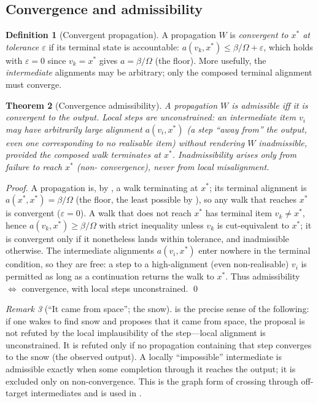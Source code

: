 \documentclass[11pt,a4paper]{article}
\theoremstyle{thmstyle}
\newtheorem{theorem}{Theorem}[section]
\theoremstyle{definition}
\newtheorem{definition}[theorem]{Definition}
\theoremstyle{remark}
\newtheorem{remark}[theorem]{Remark}
\newcommand{\flo}{\beta}                 %
\newcommand{\eps}{\varepsilon}
\begin{document}
\subsection{Convergence and admissibility}

\begin{definition}[Convergent propagation]
\label{def:convergent}
A propagation $W$ is \emph{convergent to $x^{\ast}$ at tolerance $\eps$} if
its terminal state is accountable: $a(v_k,x^{\ast})\le\flo/\Omega+\eps$,
which holds with $\eps=0$ since $v_k=x^{\ast}$ gives $a=\flo/\Omega$
(the floor). More usefully, the \emph{intermediate} alignments may be
arbitrary; only the composed terminal alignment must converge.
\end{definition}

\begin{theorem}[Convergence admissibility]
\label{thm:admissibility}
A propagation $W$ is \emph{admissible} iff it is convergent to the output.
Local steps are unconstrained: an intermediate item $v_i$ may have
arbitrarily large alignment $a(v_i,x^{\ast})$ (a step ``away from'' the
output, even one corresponding to no realisable item) without rendering
$W$ inadmissible, provided the composed walk terminates at $x^{\ast}$.
Inadmissibility arises only from failure to reach $x^{\ast}$ (non-%
convergence), never from local misalignment.
\end{theorem}

\begin{proof}
A propagation is, by , a walk terminating at
$x^{\ast}$; its terminal alignment is $a(x^{\ast},x^{\ast})=\flo/\Omega$
(the floor, the least possible by ), so any walk
that reaches $x^{\ast}$ is convergent ($\eps=0$). A walk that does not
reach $x^{\ast}$ has terminal item $v_k\neq x^{\ast}$, hence
$a(v_k,x^{\ast})\ge\flo/\Omega$ with strict inequality unless $v_k$ is
cut-equivalent to $x^{\ast}$; it is convergent only if it nonetheless lands
within tolerance, and inadmissible otherwise. The intermediate alignments
$a(v_i,x^{\ast})$ enter nowhere in the terminal condition, so they are
free: a step to a high-alignment (even non-realisable) $v_i$ is permitted
as long as a continuation returns the walk to $x^{\ast}$. Thus
admissibility $\iff$ convergence, with local steps unconstrained. \qed
\end{proof}

\begin{remark}[``It came from space''; the snow]
\label{rem:snow}
 is the precise sense of the following: if one
wakes to find snow and proposes that it came from space, the proposal is
not refuted by the local implausibility of the step---local alignment is
unconstrained. It is refuted only if no propagation containing that step
converges to the snow (the observed output). A locally ``impossible''
intermediate is admissible exactly when some completion through it reaches
the output; it is excluded only on non-convergence. This is the graph form
of crossing through off-target intermediates and is used in
.
\end{remark}
\end{document}
